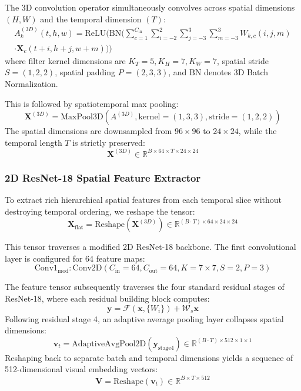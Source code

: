 \documentclass[conference,compsoc,10pt]{IEEEtran}
\begin{document}
The 3D convolution operator simultaneously convolves across spatial dimensions $(H, W)$ and the temporal dimension $(T)$:
\begin{align}
A_k^{(3D)}(t, h, w) = \text{ReLU}\Bigg( \text{BN}\Bigg( \sum_{c=1}^{C_{\text{in}}} \sum_{i=-2}^{2} \sum_{j=-3}^{3} \sum_{m=-3}^{3} W_{k, c}(i, j, m) \nonumber \\
\cdot \mathbf{X}_c(t+i, h+j, w+m) \Bigg) \Bigg)
\end{align}
where filter kernel dimensions are $K_T = 5, K_H = 7, K_W = 7$, spatial stride $S = (1, 2, 2)$, spatial padding $P = (2, 3, 3)$, and $\text{BN}$ denotes 3D Batch Normalization.

This is followed by spatiotemporal max pooling:
\begin{equation}
\mathbf{X}^{(3D)} = \text{MaxPool3D}(A^{(3D)}, \text{kernel}=(1, 3, 3), \text{stride}=(1, 2, 2))
\end{equation}
The spatial dimensions are downsampled from $96 \times 96$ to $24 \times 24$, while the temporal length $T$ is strictly preserved:
\begin{equation}
\mathbf{X}^{(3D)} \in \mathbb{R}^{B \times 64 \times T \times 24 \times 24}
\end{equation}

\subsubsection{2D ResNet-18 Spatial Feature Extractor}
To extract rich hierarchical spatial features from each temporal slice without destroying temporal ordering, we reshape the tensor:
\begin{equation}
\mathbf{X}_{\text{flat}} = \text{Reshape}\left( \mathbf{X}^{(3D)} \right) \in \mathbb{R}^{(B \cdot T) \times 64 \times 24 \times 24}
\end{equation}

This tensor traverses a modified 2D ResNet-18 backbone. The first convolutional layer is configured for 64 feature maps:
\begin{equation}
\text{Conv1}_{\text{mod}}: \text{Conv2D}(C_{\text{in}}=64, C_{\text{out}}=64, K=7 \times 7, S=2, P=3)
\end{equation}

The feature tensor subsequently traverses the four standard residual stages of ResNet-18, where each residual building block computes:
\begin{equation}
\mathbf{y} = \mathcal{F}(\mathbf{x}, \{W_i\}) + \mathcal{W}_s \mathbf{x}
\end{equation}
Following residual stage 4, an adaptive average pooling layer collapses spatial dimensions:
\begin{equation}
\mathbf{v}_t = \text{AdaptiveAvgPool2D}(\mathbf{y}_{\text{stage4}}) \in \mathbb{R}^{(B \cdot T) \times 512 \times 1 \times 1}
\end{equation}
Reshaping back to separate batch and temporal dimensions yields a sequence of 512-dimensional visual embedding vectors:
\begin{equation}
\mathbf{V} = \text{Reshape}(\mathbf{v}_t) \in \mathbb{R}^{B \times T \times 512}
\end{equation}
\end{document}
